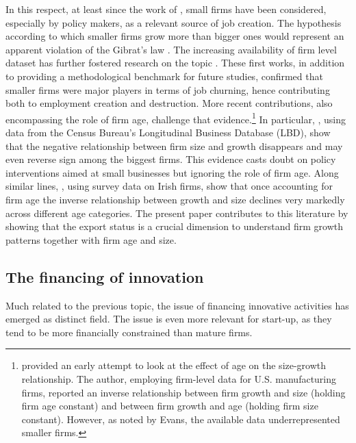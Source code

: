 \documentclass[12pt]{article}
\begin{document}
In this respect, at least
since the work of \cite{birch_1981}, small firms have been considered,
especially by policy makers, as a relevant source of job creation. The
hypothesis according to which smaller firms grow more than bigger ones
would represent an apparent violation of the Gibrat's law \citep[see,
among the others,][]{sutton_1997, lotti_etal_2003, coad_2009}. The
increasing availability of firm level dataset has further fostered
research on the topic
\citep[see, in particular,][]{davis_haltiwanger_1992, davis_etal_1996}. These first
works, in addition to providing a methodological benchmark for future
studies, confirmed that smaller firms were major players in terms of
job churning, hence contributing both to employment creation and
destruction. More recent contributions, also
encompassing the role of firm age, challenge that
evidence.\footnote{\cite{evans_1987_a, evans_1987_b} provided an early
  attempt to look at the effect of age on the size-growth
  relationship. The author, employing firm-level data for
  U.S. manufacturing firms, reported an inverse relationship between
  firm growth and size (holding firm age constant) and between firm
  growth and age (holding firm size constant). However, as noted by
  Evans, the available data underrepresented smaller firms.} In
particular, \cite{haltiwanger_etal_2013}, using data from the Census
Bureau's Longitudinal Business Database (LBD), show that the negative
relationship between firm size and growth disappears and may even
reverse sign among the biggest firms.  This evidence casts doubt on
policy interventions aimed at small businesses but ignoring the role
of firm age.  Along similar lines, \cite{lawless_2014}, using survey
data on Irish firms, show that once accounting for firm age the
inverse relationship between growth and size declines very markedly
across different age categories.  The present paper contributes to
this literature by showing that the export status is a
crucial dimension to understand firm growth patterns together with
firm age and size. 


\subsection{The financing of innovation}\label{sec:fin-innov}

Much related to the previous topic, the issue of financing innovative
activities has emerged as distinct field. The issue is even more
relevant for start-up, as they tend to be more financially constrained
than mature firms.
\end{document}
